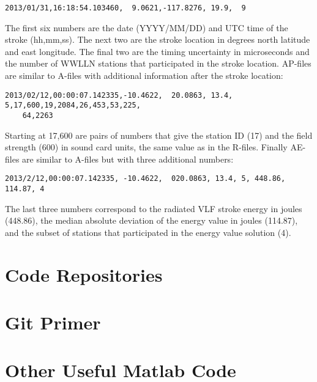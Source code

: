 \begin{verbatim}
2013/01/31,16:18:54.103460,  9.0621,-117.8276, 19.9,  9
\end{verbatim}

The first six numbers are the date (YYYY/MM/DD) and UTC time of the stroke (hh,mm,ss).
The next two are the stroke location in degrees north latitude and east longitude.
The final two are the timing uncertainty in microseconds and the number of WWLLN stations that participated in the stroke location.
AP-files are similar to A-files with additional information after the stroke location:

\begin{verbatim}
2013/02/12,00:00:07.142335,-10.4622,  20.0863, 13.4,  5,17,600,19,2084,26,453,53,225,
	64,2263
\end{verbatim}

Starting at 17,600 are pairs of numbers that give the station ID (17) and the field strength (600) in sound card units, the same value as in the R-files. Finally AE-files are similar to A-files but with three additional numbers:

\begin{verbatim}
2013/2/12,00:00:07.142335, -10.4622,  020.0863, 13.4, 5, 448.86, 114.87, 4
\end{verbatim}

The last three numbers correspond to the radiated VLF stroke energy in joules (448.86), the median absolute deviation of the energy value in joules (114.87), and the subset of stations that participated in the energy value solution (4).

\section{Code Repositories}

\section{Git Primer}

\section{Other Useful Matlab Code}
